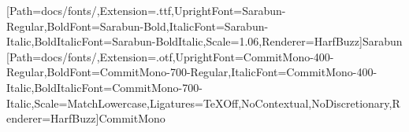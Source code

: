 
\usepackage[left=3cm,right=2.5cm,top=2.5cm,bottom=2.5cm]{geometry}

[Path=docs/fonts/,Extension=.ttf,UprightFont=Sarabun-Regular,BoldFont=Sarabun-Bold,ItalicFont=Sarabun-Italic,BoldItalicFont=Sarabun-BoldItalic,Scale=1.06,Renderer=HarfBuzz]{Sarabun}
[Path=docs/fonts/,Extension=.otf,UprightFont=CommitMono-400-Regular,BoldFont=CommitMono-700-Regular,ItalicFont=CommitMono-400-Italic,BoldItalicFont=CommitMono-700-Italic,Scale=MatchLowercase,Ligatures={TeXOff,NoContextual,NoDiscretionary},Renderer=HarfBuzz]{CommitMono}
\linespread{1.30}

\usepackage{booktabs,longtable,array,graphicx,tikz,xcolor}
\usepackage{float}
\usepackage{needspace}
\usepackage{pifont}
\newcommand{\yesmark}{\ding{51}}
\newcommand{\nomark}{\textendash}
\usepackage{ragged2e}
\usepackage{framed}
\usepackage[titles]{tocloft}
\usepackage{url}
\usepackage[unicode,colorlinks=true,linkcolor=black,urlcolor=blue,citecolor=black]{hyperref}

\DeclareRobustCommand{\thaiwordbreak}{\hspace{0pt plus 0.1em}}
\pdfstringdefDisableCommands{\def\thaiwordbreak{}}


\renewcommand{\cftdotsep}{2.5}
\renewcommand{\cftsecleader}{\cftdotfill{\cftdotsep}}
\renewcommand{\cftsubsecleader}{\cftdotfill{\cftdotsep}}
\renewcommand{\cftsubsubsecleader}{\cftdotfill{\cftdotsep}}
\renewcommand{\cftfigleader}{\cftdotfill{\cftdotsep}}
\renewcommand{\cfttableader}{\cftdotfill{\cftdotsep}}
\setcounter{tocdepth}{1}
\hypersetup{bookmarksdepth=3}

